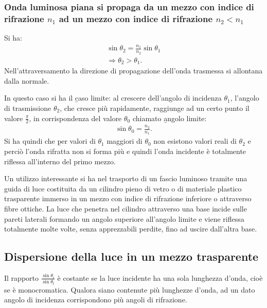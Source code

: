 \subsubsection{Onda luminosa piana si propaga da un mezzo con indice di rifrazione $n_1$ ad un mezzo con indice di rifrazione $n_2<n_1$}
Si ha:
\begin{equation}\begin{split}
\sin{\theta_2}=\frac{n_1}{n_2}\sin{\theta_1}\\
\Longrightarrow \theta_2>\theta_1.
\end{split}\end{equation}
Nell'attraversamento la direzione di propagazione dell'onda trasmessa si allontana dalla normale.

In questo caso si ha il \b{caso limite}: al crescere dell'angolo di incidenza $\theta_1$, l'angolo di trasmissione $\theta_2$, che cresce più rapidamente, raggiunge ad un certo punto il valore $\frac{\pi}{2}$, in corrispondenza del valore $\theta_0$ chiamato \b{angolo limite}:
\begin{equation}\begin{split}
\sin{\theta_0}=\frac{n_2}{n_1}.
\end{split}\end{equation}
Si ha quindi che \b{per valori di $\theta_1$ maggiori di $\theta_0$ non esistono valori reali di $\theta_2$ e perciò l'onda rifratta non si forma più e quindi l'onda incidente è totalmente riflessa all'interno del primo mezzo}.

Un utilizzo interessante si ha nel trasporto di un fascio luminoso tramite una guida di luce costituita da un cilindro pieno di vetro o di materiale plastico trasparente immerso in un mezzo con indice di rifrazione inferiore o attraverso fibre ottiche. La luce che penetra nel cilindro attraverso una base incide sulle pareti laterali formando un angolo superiore all'angolo limite e viene riflessa totalmente molte volte, senza apprezzabili perdite, fino ad uscire dall'altra base.

\subsection{Dispersione della luce in un mezzo trasparente}
Il rapporto $\frac{\sin{\theta_i}}{\sin{\theta_t}}$ è costante se la luce incidente ha una sola lunghezza d'onda, cioè se è monocromatica. Qualora siano contenute più lunghezze d'onda, ad un dato angolo di incidenza corrispondono più angoli di rifrazione.

